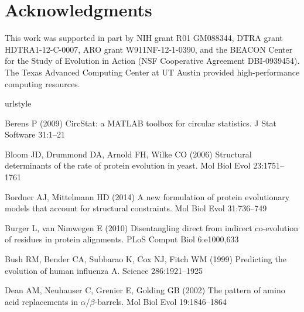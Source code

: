 \documentclass[smallextended]{svjour3}
\begin{document}
\section*{Acknowledgments}

This work was supported in part by NIH grant R01 GM088344, DTRA grant HDTRA1-12-C-0007, ARO grant W911NF-12-1-0390, and the BEACON Center for the Study of Evolution in Action (NSF Cooperative Agreement DBI-0939454). The Texas Advanced Computing Center at UT Austin provided high-performance computing resources.


\begin{thebibliography}{55}
\providecommand{\natexlab}[1]{#1}
\providecommand{\url}[1]{{#1}}
\providecommand{\urlprefix}{URL }
\expandafter\ifx\csname urlstyle\endcsname\relax
  \providecommand{\doi}[1]{DOI~\discretionary{}{}{}#1}\else
  \providecommand{\doi}{DOI~\discretionary{}{}{}\begingroup
  \urlstyle{rm}\Url}\fi
\providecommand{\eprint}[2][]{\url{#2}}

Berens P (2009) {CircStat:} a {MATLAB} toolbox for circular statistics. J Stat
  Software 31:1--21

Bloom JD, Drummond DA, Arnold FH, Wilke CO (2006) Structural determinants of
  the rate of protein evolution in yeast. Mol Biol Evol 23:1751--1761

Bordner AJ, Mittelmann HD (2014) A new formulation of protein evolutionary
  models that account for structural constraints. Mol Biol Evol 31:736--749

Burger L, van Nimwegen E (2010) Disentangling direct from indirect co-evolution
  of residues in protein alignments. PLoS Comput Biol 6:e1000,633

Bush RM, Bender CA, Subbarao K, Cox NJ, Fitch WM (1999) Predicting the
  evolution of human influenza {A}. Science 286:1921--1925

Dean AM, Neuhauser C, Grenier E, Golding GB (2002) The pattern of amino acid
  replacements in $\alpha$/$\beta$-barrels. Mol Biol Evol 19:1846--1864


\end{thebibliography}
\end{document}
